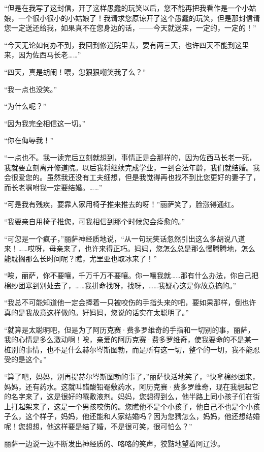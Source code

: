 \par “但是在我写了这封信，开了这样愚蠢的玩笑以后，您不能再把我看作是一个小姑娘，一个很小很小的小姑娘了！我请求您原谅开了这个愚蠢的玩笑，但是那封信请您一定送还给我，如果真不在您身边的话，——今天就送来，一定的，一定的！”
\par “今天无论如何办不到，我回到修道院里去，要有两三天，也许四天不能到这里来，因为佐西马长老……”
\par “四天，真是胡闹！喂，您狠狠嘲笑我了么？”
\par “我一点也没笑。”
\par “为什么呢？”
\par “因为我完全相信这一切。”
\par “你在侮辱我！”
\par “一点也不。我一读完后立刻就想到，事情正是会那样的，因为佐西马长老一死，我就要立刻离开修道院。以后我将继续完成学业，一到合法年龄，我们就结婚。我会很爱您的。虽然我还没有工夫细想，但是我觉得再也找不到比您更好的妻子了，而长老嘱咐我一定要结婚。……”
\par “可是我有残疾，要靠人家用椅子推来推去的呀！”丽萨笑了，脸涨得通红。
\par “我要亲自用椅子推您，可我相信到那个时候您会痊愈的。”
\par “可您是一个疯子，”丽萨神经质地说，“从一句玩笑话忽然引出这么多胡说八道来！……哎呀，母亲来了，也许来得正巧。妈妈，您怎么总是那么慢腾腾地，怎么能耽搁那么长时间呢？瞧，尤里亚也取冰来了！”
\par “唉，丽萨，你不要嚷，千万千万不要嚷。你一嚷我就……那有什么办法，你自己把棉纱团塞到别处去了，……我拼命找呀，找呀，……我疑心这是你故意搞的。”
\par “我总不可能知道他一定会捧着一只被咬伤的手指头来的吧，要如果那样，倒也许真的是我故意这样做的。好妈妈，您说的话实在太聪明了。”
\par “就算是太聪明吧，但是为了阿历克赛·费多罗维奇的手指和一切别的事，丽萨，我的心情是多么激动啊！唉，亲爱的阿历克赛·费多罗维奇，使我要命的不是某一桩别的事情，也不是什么赫尔岑斯图勃，而是所有这一切，整个的一切，我不能忍受的是这个。”
\par “算了吧，妈妈，别再提赫尔岑斯图勃的事了，”丽萨快活地笑了，“快拿棉纱团来，妈妈，还有药水。这就叫醋酸铅罨敷药水，阿历克赛·费多罗维奇，现在我想起它的名字来了，这是很好的罨敷液剂。妈妈，您想得到么，他半路上同小孩子们在街上打起架来了，这是一个男孩咬伤的。您瞧他不是个小孩子，他自己不也是个小孩子么，这个样子，妈妈，他还能和人家结婚吗？因为您猜怎么，妈妈，他还想结婚呢！您想想，他这样要是结了婚，不是很可笑，很可怕么？”
\par 丽萨一边说一边不断发出神经质的、咯咯的笑声，狡黠地望着阿辽沙。
